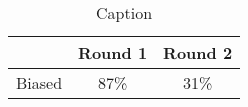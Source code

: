 \begin{table}[]
    \centering
    \begin{tabular}{c|c|c}\hline
    & Round 1  & Round 2 \\\hline
      Biased   & 87\% & 31\%\\\hline
    \end{tabular}
    \caption{Caption}
    \label{tab:occupation}
\end{table}

